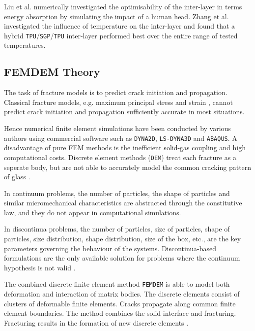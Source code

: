 \documentclass[format=acmtog, 12pt, screen=true, review=false]{acmart}
\begin{document}
\bigbreak
Liu et al. \cite{Liu16} numerically investigated the optimisability of the inter-layer in terms energy absorption by simulating the impact of a human head. Zhang et al. \cite{Zha19} investigated the influence of temperature on the inter-layer and found that a hybrid \texttt{TPU}/\texttt{SGP}/\texttt{TPU} inter-layer performed best over the entire range of tested temperatures.

\subsection{FEMDEM Theory}

The task of fracture models is to predict crack initiation and propagation. Classical fracture models, e.g. maximum principal stress and strain \cite{Alt17}, cannot predict crack initiation and propagation sufficiently accurate in most situations. 

\bigbreak
Hence numerical finite element simulations have been conducted by various authors using commercial software such as \texttt{DYNA2D}, \texttt{LS-DYNA3D} and \texttt{ABAQUS}. A disadvantage of pure FEM methods is the inefficient solid-gas coupling and high computational costs. Discrete element methods (\texttt{DEM}) treat each fracture as a seperate body, but are not able to accurately model the common cracking pattern of glass \cite{Che17}.

\bigbreak
In continuum problems, the number of particles, the shape of particles and similar micromechanical characteristics are abstracted through the constitutive law, and they do not appear in computational simulations. 

\bigbreak
In discontinua problems, the number of particles, size of particles, shape of particles, size distribution, shape distribution, size of the box, etc., are the key parameters governing the behaviour of the systems. Discontinua-based formulations are the only available solution for problems where the continuum hypothesis is not valid \cite{Mun04}.

\bigbreak
The combined discrete finite element method \texttt{FEMDEM} \cite{Wan18, Mun95, Mun99, Mun04, Mun12, Mun13, Guo16, Gao14, Xu14, Che18} is able to model both deformation and interaction of matrix bodies. The discrete elements consist of clusters of deformable finite elements. Cracks propagate along common finite element boundaries. The method combines the solid interface and fracturing. Fracturing results in the formation of new discrete elements \cite{Mun13}. 
\end{document}
